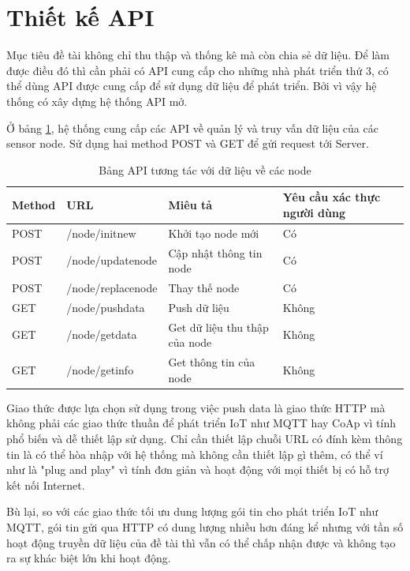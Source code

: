 \section{Thiết kế API}\label{sec: api}
Mục tiêu đề tài không chỉ thu thập và thống kê mà còn chia sẻ dữ liệu. Để làm được điều đó thì cần phải có API cung cấp cho những nhà phát triển thứ 3, có thể dùng API được cung cấp để sử dụng dữ liệu để phát triển. Bởi vì vậy hệ thống có xây dựng hệ thống API mở.

Ở bảng \ref{table: apilist}, hệ thống cung cấp các API về quản lý và truy vấn dữ liệu của các sensor node. Sử dụng hai method POST và GET để gửi request tới Server. 

\begin{table}[H]
	\centering
	\caption{Bảng API tương tác với dữ liệu về các node}
	\begin{tabular}{|l|l|l|l|}
		\hline
		Method & URL            & Miêu tả         & Yêu cầu xác thực người dùng        \\ \hline
		POST   & /node/initnew       & Khởi tạo node mới                & Có           \\ \hline
		POST   & /node/updatenode     & Cập nhật thông tin node & Có \\ \hline
		POST   & /node/replacenode       & Thay thế node  & Có       \\ \hline
		GET   & /node/pushdata & Push dữ liệu               &         Không                \\ \hline
		GET   & /node/getdata    & Get dữ liệu thu thập của node         &  Không      \\ \hline
		GET   & /node/getinfo   & Get thông tin của node & Không  \\ \hline
	\end{tabular}
	\label{table: apilist}
\end{table}

Giao thức được lựa chọn sử dụng trong việc push data là giao thức HTTP mà không phải các giao thức thuần để phát triển IoT như MQTT hay CoAp vì tính phổ biến và dễ thiết lập sử dụng. Chỉ cần thiết lập chuỗi URL có đính kèm thông tin là có thể hòa nhập với hệ thống mà không cần thiết lập gì thêm, có thể ví như là "plug and play" vì tính đơn giản và hoạt động với mọi thiết bị có hỗ trợ kết nối Internet.

Bù lại, so với các giao thức tối ưu dung lượng gói tin cho phát triển IoT như MQTT, gói tin gửi qua HTTP có dung lượng nhiều hơn đáng kể nhưng với tần số hoạt động truyền dữ liệu của đề tài thì vẫn có thể chấp nhận được và không tạo ra sự khác biệt lớn khi hoạt động.


